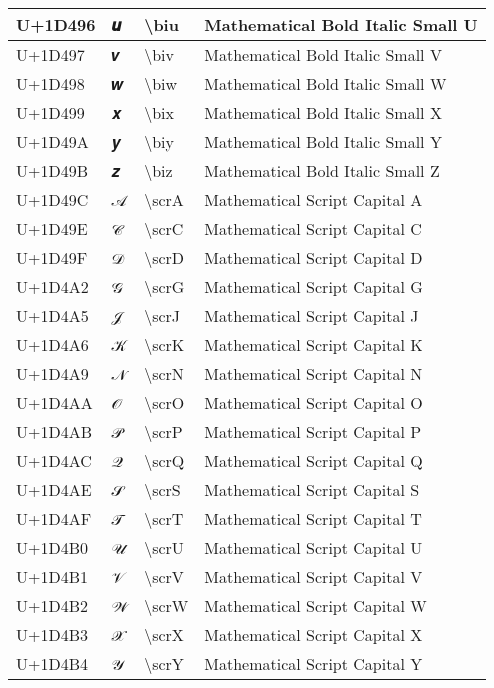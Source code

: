 \begin{table}[h]
\begin{tabulary}{\linewidth}{|L|L|L|L|}
\hline
U+1D496 & 𝒖 & {\textbackslash}biu & Mathematical Bold Italic Small U \\
\hline
U+1D497 & 𝒗 & {\textbackslash}biv & Mathematical Bold Italic Small V \\
\hline
U+1D498 & 𝒘 & {\textbackslash}biw & Mathematical Bold Italic Small W \\
\hline
U+1D499 & 𝒙 & {\textbackslash}bix & Mathematical Bold Italic Small X \\
\hline
U+1D49A & 𝒚 & {\textbackslash}biy & Mathematical Bold Italic Small Y \\
\hline
U+1D49B & 𝒛 & {\textbackslash}biz & Mathematical Bold Italic Small Z \\
\hline
U+1D49C & 𝒜 & {\textbackslash}scrA & Mathematical Script Capital A \\
\hline
U+1D49E & 𝒞 & {\textbackslash}scrC & Mathematical Script Capital C \\
\hline
U+1D49F & 𝒟 & {\textbackslash}scrD & Mathematical Script Capital D \\
\hline
U+1D4A2 & 𝒢 & {\textbackslash}scrG & Mathematical Script Capital G \\
\hline
U+1D4A5 & 𝒥 & {\textbackslash}scrJ & Mathematical Script Capital J \\
\hline
U+1D4A6 & 𝒦 & {\textbackslash}scrK & Mathematical Script Capital K \\
\hline
U+1D4A9 & 𝒩 & {\textbackslash}scrN & Mathematical Script Capital N \\
\hline
U+1D4AA & 𝒪 & {\textbackslash}scrO & Mathematical Script Capital O \\
\hline
U+1D4AB & 𝒫 & {\textbackslash}scrP & Mathematical Script Capital P \\
\hline
U+1D4AC & 𝒬 & {\textbackslash}scrQ & Mathematical Script Capital Q \\
\hline
U+1D4AE & 𝒮 & {\textbackslash}scrS & Mathematical Script Capital S \\
\hline
U+1D4AF & 𝒯 & {\textbackslash}scrT & Mathematical Script Capital T \\
\hline
U+1D4B0 & 𝒰 & {\textbackslash}scrU & Mathematical Script Capital U \\
\hline
U+1D4B1 & 𝒱 & {\textbackslash}scrV & Mathematical Script Capital V \\
\hline
U+1D4B2 & 𝒲 & {\textbackslash}scrW & Mathematical Script Capital W \\
\hline
U+1D4B3 & 𝒳 & {\textbackslash}scrX & Mathematical Script Capital X \\
\hline
U+1D4B4 & 𝒴 & {\textbackslash}scrY & Mathematical Script Capital Y \\

\end{tabulary}
\end{table}
